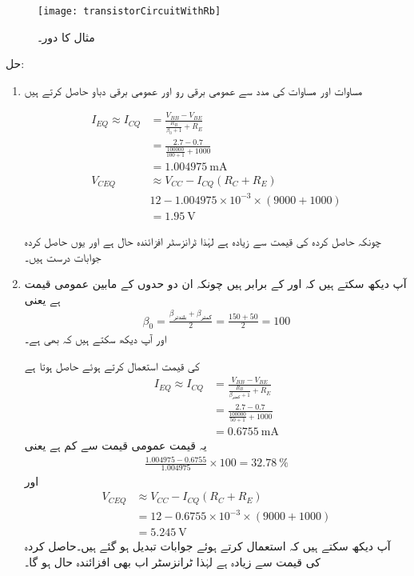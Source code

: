\begin{figure}
\centering
\texttt{[image: transistorCircuitWithRb]}
\caption{مثال  کا دور۔}
\label{شکل_تینوں_سروں_پر_مزاحمت_دوبارہ}
\end{figure}
حل:
\begin{enumerate}
\item
مساوات   اور مساوات   کی مدد سے عمومی برقی رو اور عمومی برقی دباو حاصل کرتے ہیں

\begin{align*}
I_{EQ} \approx I_{CQ} &= \frac{V_{BB}-V_{BE}}{\frac{R_B}{\beta_0+1}+R_E}\\
&=\frac{2.7-0.7}{\frac{100000}{100+1}+1000}\\
&=\SI{1.004975}{\milli \ampere}\\
V_{CEQ} &\approx V_{CC}-I_{CQ} \left(R_C+R_E \right )\\
&12-1.004975 \times 10^{-3} \times \left (9000+1000 \right )\\
&=\SI{1.95}{\volt}
\end{align*}
	
چونکہ حاصل کردہ   کی قیمت  سے زیادہ ہے لہٰذا ٹرانزسٹر 	افزائندہ حال ہے اور یوں حاصل کردہ  جوابات درست ہیں۔
\item
آپ دیکھ سکتے ہیں کہ  اور  کے برابر ہیں چونکہ ان دو حدوں کے مابین عمومی قیمت   ہے یعنی
\begin{align*}
\beta_0 =\frac{\beta_{\text{بلندتر}}+\beta_{\text{کمتر}}}{2} = \frac{150+50}{2}=100
\end{align*}
اور آپ دیکھ سکتے ہیں کہ  بھی ہے۔



	 کی قیمت استعمال کرتے ہوئے حاصل ہوتا ہے
\begin{align*}
I_{EQ} \approx I_{CQ} &=\frac{V_{BB}-V_{BE}}{\frac{R_B}{\beta_{\text{کمتر}}+1}+R_E}\\
&=\frac{2.7-0.7}{\frac{100000}{50+1}+1000}\\
&=\SI{0.6755}{\milli \ampere}
\end{align*}
یہ قیمت عمومی قیمت سے   کم ہے یعنی
\begin{align*}
\frac{1.004975-0.6755}{1.004975} \times 100 = \SI{32.78}{\percent}
\end{align*}
اور
\begin{align*}
V_{CEQ}  & \approx V_{CC}-I_{CQ} \left (R_C+R_E \right )\\
&=12-0.6755 \times 10^{-3} \times \left (9000+1000 \right )\\
&=\SI{5.245}{\volt}
\end{align*}
	آپ دیکھ سکتے ہیں کہ  استعمال کرتے ہوئے جوابات تبدیل ہو گئے ہیں۔حاصل کردہ   کی قیمت  سے زیادہ ہے لہٰذا ٹرانزسٹر اب بھی افزائندہ حال  ہو گا۔


\end{enumerate}
